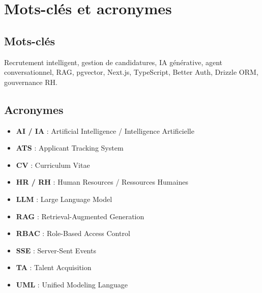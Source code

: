 \chapter*{Mots-clés et acronymes}

\section*{Mots-clés}
Recrutement intelligent, gestion de candidatures, IA générative, agent conversationnel, RAG, pgvector, Next.js, TypeScript, Better Auth, Drizzle ORM, gouvernance RH.

\section*{Acronymes}
\begin{itemize}
  \item \textbf{AI / IA} : Artificial Intelligence / Intelligence Artificielle
  \item \textbf{ATS} : Applicant Tracking System
  \item \textbf{CV} : Curriculum Vitae
  \item \textbf{HR / RH} : Human Resources / Ressources Humaines
  \item \textbf{LLM} : Large Language Model
  \item \textbf{RAG} : Retrieval-Augmented Generation
  \item \textbf{RBAC} : Role-Based Access Control
  \item \textbf{SSE} : Server-Sent Events
  \item \textbf{TA} : Talent Acquisition
  \item \textbf{UML} : Unified Modeling Language
\end{itemize}
